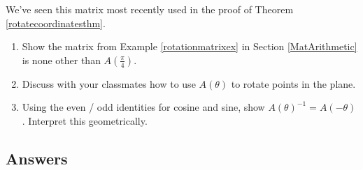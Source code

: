  \smallskip
 
 We've seen this matrix most recently  used in the proof of Theorem \ref{rotatecoordinatesthm}.

\begin{enumerate}
\setcounter{enumi}{\value{HW}}
\item  Show the matrix from Example \ref{rotationmatrixex} in Section \ref{MatArithmetic} is none other than $A\left(\frac{\pi}{4}\right)$.

\item  Discuss with your classmates how to use $A(\theta)$ to rotate points in the plane.

\item  Using the even / odd identities for cosine and sine,  show $A(\theta)^{-1} = A(-\theta)$.  Interpret this geometrically.



\end{enumerate}

\newpage

\subsection{Answers}

